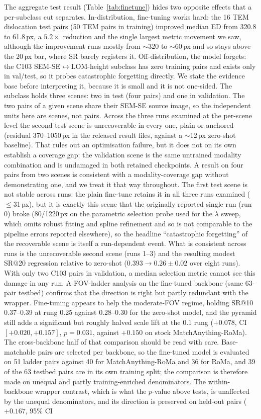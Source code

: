 \documentclass[fleqn,10pt]{wlscirep}
\begin{document}
The aggregate test result (Table~\ref{tab:finetune}) hides two opposite effects that a per-subclass cut separates. In-distribution, fine-tuning works hard: the 16 TEM dislocation test pairs (50 TEM pairs in training) improved median ED from 320.8 to 61.8\,px, a $5.2\times$ reduction and the single largest metric movement we saw, although the improvement runs mostly from $\sim$320 to $\sim$60\,px and so stays above the 20\,px bar, where SR barely registers it. Off-distribution, the model forgets: the C103 SEM-SE$\leftrightarrow$LOM-height subclass has zero training pairs and exists only in val/test, so it probes catastrophic forgetting directly. We state the evidence base before interpreting it, because it is small and it is not one-sided. The subclass holds three scenes: two in test (four pairs) and one in validation. The two pairs of a given scene share their SEM-SE source image, so the independent units here are scenes, not pairs. Across the three runs examined at the per-scene level the second test scene is unrecoverable in every one, plain or anchored (residual 370--1050\,px in the released result files, against a $\sim$12\,px zero-shot baseline). That rules out an optimisation failure, but it does not on its own establish a coverage gap: the validation scene is the same untrained modality combination and is undamaged in both retained checkpoints. A result on four pairs from two scenes is consistent with a modality-coverage gap without demonstrating one, and we treat it that way throughout. The first test scene is not stable across runs: the plain fine-tune retains it in all three runs examined ($\le$31\,px), but it is exactly this scene that the originally reported single run (run 0) broke (80/1220\,px on the parametric selection probe used for the $\lambda$ sweep, which omits robust fitting and spline refinement and so is not comparable to the pipeline errors reported elsewhere), so the headline ``catastrophic forgetting'' of the recoverable scene is itself a run-dependent event. What is consistent across runs is the unrecoverable second scene (runs 1--3) and the resulting modest SR@20 regression relative to zero-shot ($0.393\rightarrow0.26\pm0.02$ over eight runs). With only two C103 pairs in validation, a median selection metric cannot see this damage in any run. A FOV-ladder analysis on the fine-tuned backbone (same 63-pair testbed) confirms that the direction is right but partly redundant with the wrapper. Fine-tuning appears to help the moderate-FOV regime, holding SR@10 0.37--0.39 at rung 0.25 against 0.28--0.30 for the zero-shot model, and the pyramid still adds a significant but roughly halved scale lift at the 0.1 rung ($+0.078$, CI $[+0.020,+0.157]$, $p=0.031$, against $+0.150$ on stock MatchAnything-RoMa). The cross-backbone half of that comparison should be read with care. Base-matchable pairs are selected per backbone, so the fine-tuned model is evaluated on 51 ladder pairs against 40 for MatchAnything-RoMa and 36 for RoMa, and 39 of the 63 testbed pairs are in its own training split; the comparison is therefore made on unequal and partly training-enriched denominators. The within-backbone wrapper contrast, which is what the $p$-value above tests, is unaffected by the unequal denominators, and its direction is preserved on held-out pairs ($+0.167$, 95\% CI 
\end{document}

